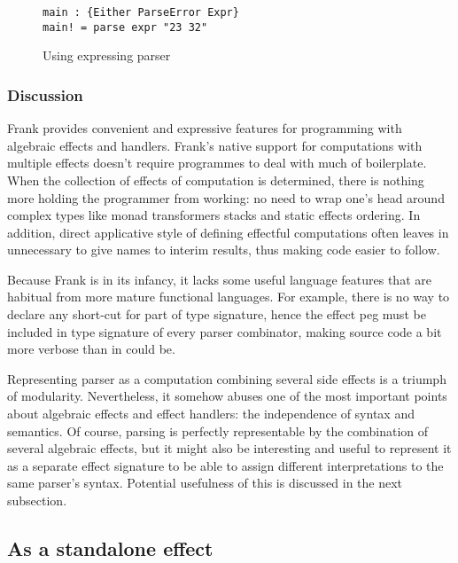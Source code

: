       \begin{figure}[h]
      \begin{lstlisting}
main : {Either ParseError Expr}
main! = parse expr "23 32"
      \end{lstlisting}
      \caption{Using expressing parser}
      \label{listing:parserExprMainCombo}
      \end{figure}

    \subsubsection{Discussion}

    Frank provides convenient and expressive features for programming with
    algebraic effects and handlers. Frank's native support for computations with
    multiple effects doesn't require programmes to deal with much of boilerplate.
    When the collection of effects of computation is determined, there is nothing
    more holding the programmer from working: no need to wrap one's head around
    complex types like monad transformers stacks and static effects ordering.
    In addition, direct applicative style of defining effectful computations often
    leaves in unnecessary to give names to interim results, thus making code
    easier to follow.

    Because Frank is in its infancy, it lacks some useful language features that
    are habitual from more mature functional languages. For example, there is no
    way to declare any short-cut for part of type signature, hence the
    effect peg must be included in type signature of every parser combinator, making
    source code a bit more verbose than in could be.

    Representing parser as a computation combining several side effects is a
    triumph of modularity. Nevertheless, it somehow abuses one of the most important
    points about algebraic effects and effect handlers: the independence of
    syntax and semantics. Of course, parsing is perfectly representable by the
    combination of several algebraic effects, but it might also be interesting
    and useful to represent it as a separate effect signature to be able to assign
    different interpretations to the same parser's syntax. Potential usefulness
    of this is discussed in the next subsection.


  \subsection{As a standalone effect}


